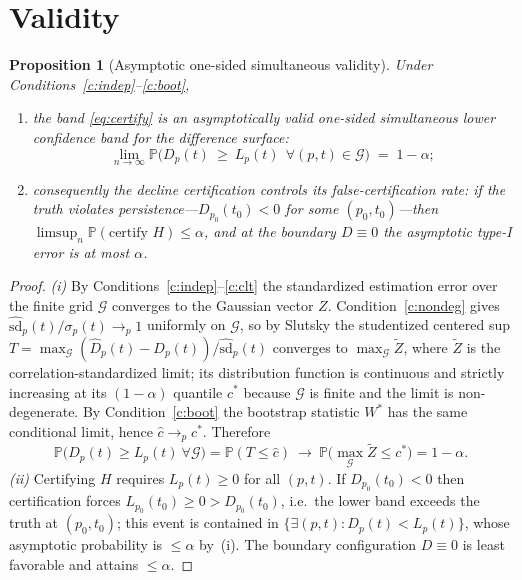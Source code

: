 \documentclass[12pt]{article}
\newtheorem{proposition}{Proposition}
\theoremstyle{definition}
\theoremstyle{remark}
\newcommand{\Dhat}{\widehat D}
\newcommand{\sdhat}{\widehat{\mathrm{sd}}}
\renewcommand{\Pr}{\mathbb{P}}
\begin{document}
\section*{Validity}

\begin{proposition}[Asymptotic one-sided simultaneous validity]\label{prop:engine}
Under Conditions~\ref{c:indep}--\ref{c:boot},
\begin{enumerate}
\item[(i)] the band \eqref{eq:certify} is an asymptotically valid one-sided simultaneous
lower confidence band for the difference surface:
\[
  \lim_{n\to\infty}\Pr\Big(D_p(t)\ \ge\ L_p(t)\ \ \forall (p,t)\in\mathcal G\Big)\;=\;1-\alpha;
\]
\item[(ii)] consequently the decline certification controls its false-certification rate:
if the truth violates persistence---$D_{p_0}(t_0)<0$ for some $(p_0,t_0)$---then
$\limsup_n \Pr(\text{certify }H)\le\alpha$, and at the boundary $D\equiv0$ the asymptotic
type-I error is at most $\alpha$.
\end{enumerate}
\end{proposition}

\begin{proof}
\emph{(i)} By Conditions~\ref{c:indep}--\ref{c:clt} the standardized estimation error over the
finite grid $\mathcal G$ converges to the Gaussian vector $Z$. Condition~\ref{c:nondeg} gives
$\sdhat_p(t)/\sigma_p(t)\to_p 1$ uniformly on $\mathcal G$, so by Slutsky the studentized
centered sup
$T=\max_{\mathcal G}(\Dhat_p(t)-D_p(t))/\sdhat_p(t)$ converges to $\max_{\mathcal G}\widetilde
Z$, where $\widetilde Z$ is the correlation-standardized limit; its distribution function is
continuous and strictly increasing at its $(1-\alpha)$ quantile $c^{*}$ because $\mathcal G$
is finite and the limit is non-degenerate. By Condition~\ref{c:boot} the bootstrap statistic
$W^{*}$ has the same conditional limit, hence $\widehat c\to_p c^{*}$. Therefore
\[
  \Pr\big(D_p(t)\ge L_p(t)\ \forall\mathcal G\big)
  =\Pr(T\le\widehat c)\ \longrightarrow\ \Pr\big(\max_{\mathcal G}\widetilde Z\le c^{*}\big)=1-\alpha .
\]
\emph{(ii)} Certifying $H$ requires $L_{p}(t)\ge0$ for all $(p,t)$. If $D_{p_0}(t_0)<0$ then
certification forces $L_{p_0}(t_0)\ge0>D_{p_0}(t_0)$, i.e.\ the lower band exceeds the truth at
$(p_0,t_0)$; this event is contained in $\{\exists(p,t):D_p(t)<L_p(t)\}$, whose asymptotic
probability is $\le\alpha$ by~(i). The boundary configuration $D\equiv0$ is least favorable
and attains $\le\alpha$.
\end{proof}
\end{document}
